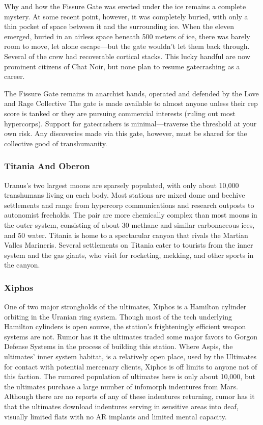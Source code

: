 Why and how the Fissure Gate was erected under 
the ice remains a complete mystery. At some recent 
point, however, it was completely buried, with only 
a thin pocket of space between it and the surrounding
ice. When the eleven emerged, buried in an
airless space beneath 500 meters of ice, there was 
barely room to move, let alone escape—but the gate 
wouldn't let them back through. Several of the crew 
had recoverable cortical stacks. This lucky handful are 
now prominent citizens of Chat Noir, but none plan 
to resume gatecrashing as a career.

The Fissure Gate remains in anarchist hands, 
operated and defended by the Love and Rage Collective
The gate is made available to almost anyone
unless their rep score is tanked or they are pursuing 
commercial interests (ruling out most hypercorps). 
Support for gatecrashers is minimal—traverse the 
threshold at your own risk. Any discoveries made via 
this gate, however, must be shared for the collective 
good of transhumanity.

\subsubsection{Titania And Oberon}

Uranus's two largest moons are sparsely populated, 
with only about 10,000 transhumans living on each 
body. Most stations are mixed dome and beehive settlements
and range from hypercorp communications
and research outposts to autonomist freeholds. The 
pair are more chemically complex than most moons in 
the outer system, consisting of about 30%
methane and similar carbonaceous ices, and 50%
water. Titania is home to a spectacular canyon that 
rivals the Martian Valles Marineris. Several settlements 
on Titania cater to tourists from the inner system and 
the gas giants, who visit for rocketing, mekking, and 
other sports in the canyon.

\subsubsection{Xiphos}

One of two major strongholds of the ultimates, Xiphos 
is a Hamilton cylinder orbiting in the Uranian ring 
system. Though most of the tech underlying Hamilton 
cylinders is open source, the station's frighteningly 
efficient weapon systems are not. Rumor has it the 
ultimates traded some major favors to Gorgon Defense
Systems in the process of building this station.
Where Aspis, the ultimates' inner system habitat, 
is a relatively open place, used by the Ultimates for 
contact with potential mercenary clients, Xiphos is 
off limits to anyone not of this faction. The rumored 
population of ultimates here is only about 10,000, but 
the ultimates purchase a large number of infomorph 
indentures from Mars. Although there are no reports 
of any of these indentures returning, rumor has it that 
the ultimates download indentures serving in sensitive
areas into deaf, visually limited flats with no AR
implants and limited mental capacity.

